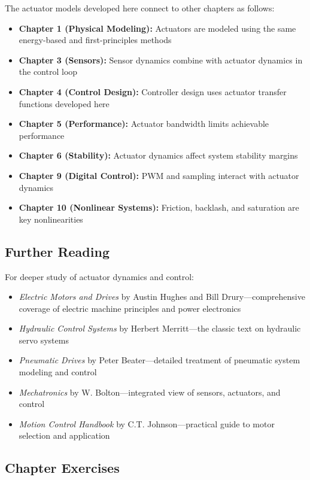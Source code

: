 The actuator models developed here connect to other chapters as follows:

\begin{itemize}
    \item \textbf{Chapter 1 (Physical Modeling):} Actuators are modeled using the same energy-based and first-principles methods
    \item \textbf{Chapter 3 (Sensors):} Sensor dynamics combine with actuator dynamics in the control loop
    \item \textbf{Chapter 4 (Control Design):} Controller design uses actuator transfer functions developed here
    \item \textbf{Chapter 5 (Performance):} Actuator bandwidth limits achievable performance
    \item \textbf{Chapter 6 (Stability):} Actuator dynamics affect system stability margins
    \item \textbf{Chapter 9 (Digital Control):} PWM and sampling interact with actuator dynamics
    \item \textbf{Chapter 10 (Nonlinear Systems):} Friction, backlash, and saturation are key nonlinearities
\end{itemize}

\subsection{Further Reading}

For deeper study of actuator dynamics and control:

\begin{itemize}
    \item \textit{Electric Motors and Drives} by Austin Hughes and Bill Drury---comprehensive coverage of electric machine principles and power electronics
    \item \textit{Hydraulic Control Systems} by Herbert Merritt---the classic text on hydraulic servo systems
    \item \textit{Pneumatic Drives} by Peter Beater---detailed treatment of pneumatic system modeling and control
    \item \textit{Mechatronics} by W. Bolton---integrated view of sensors, actuators, and control
    \item \textit{Motion Control Handbook} by C.T. Johnson---practical guide to motor selection and application
\end{itemize}

\subsection{Chapter Exercises}

